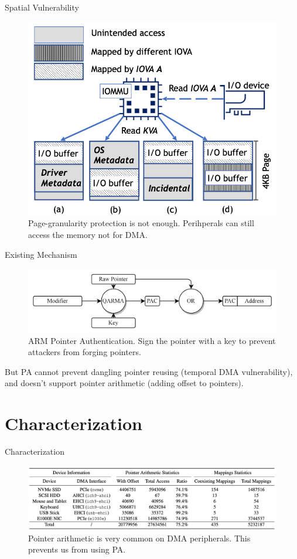 \documentclass[10pt,aspectratio=169,mathserif]{beamer}
\begin{document}
\begin{frame}{Spatial Vulnerability}
	\begin{figure}
		\centering
		\includegraphics[width=0.52\linewidth]{./images/spatial.png}
		\caption{Page-granularity protection is not enough. Perihperals can still access the memory not for DMA.}
	\end{figure}	
\end{frame}

\begin{frame}{Existing Mechanism}
	\begin{figure}
		\centering
		\includegraphics[width=0.9\linewidth]{./images/pa.png}
		\caption{ARM Pointer Authentication. Sign the pointer with a key to prevent attackers from forging pointers.}
	\end{figure}
	But PA cannot prevent dangling pointer reusing (temporal DMA vulnerability), and doesn't support pointer arithmetic (adding offset to pointers).
\end{frame}

\section{Characterization}
\begin{frame}{Characterization}
	\begin{figure}
		\centering
		\includegraphics[width=\linewidth]{./images/char.png}
		\caption{Pointer arithmetic is very common on DMA peripherals. This prevents us from using PA.}
	\end{figure}

\end{frame}
\end{document}
